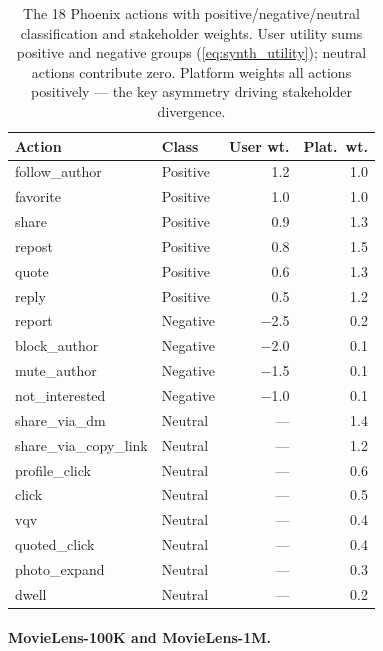 \documentclass[11pt,letterpaper]{article}
\begin{document}
\begin{table}[t]
  \caption{The 18 Phoenix actions with positive/negative/neutral
    classification and stakeholder weights. User utility sums
    positive and negative groups (\cref{eq:synth_utility}); neutral
    actions contribute zero. Platform weights all actions positively
    --- the key asymmetry driving stakeholder divergence.}
  \label{tab:actions}
  \centering\small
  \begin{tabular}{llrr}
    \toprule
    \textbf{Action} & \textbf{Class} & \textbf{User wt.} & \textbf{Plat.\ wt.} \\
    \midrule
    follow\_author          & Positive  & 1.2   & 1.0 \\
    favorite                & Positive  & 1.0   & 1.0 \\
    share                   & Positive  & 0.9   & 1.3 \\
    repost                  & Positive  & 0.8   & 1.5 \\
    quote                   & Positive  & 0.6   & 1.3 \\
    reply                   & Positive  & 0.5   & 1.2 \\
    \midrule
    report                  & Negative  & $-$2.5 & 0.2 \\
    block\_author           & Negative  & $-$2.0 & 0.1 \\
    mute\_author            & Negative  & $-$1.5 & 0.1 \\
    not\_interested         & Negative  & $-$1.0 & 0.1 \\
    \midrule
    share\_via\_dm          & Neutral   & ---   & 1.4 \\
    share\_via\_copy\_link  & Neutral   & ---   & 1.2 \\
    profile\_click          & Neutral   & ---   & 0.6 \\
    click                   & Neutral   & ---   & 0.5 \\
    vqv                     & Neutral   & ---   & 0.4 \\
    quoted\_click           & Neutral   & ---   & 0.4 \\
    photo\_expand           & Neutral   & ---   & 0.3 \\
    dwell                   & Neutral   & ---   & 0.2 \\
    \bottomrule
  \end{tabular}
\end{table}

\paragraph{MovieLens-100K and MovieLens-1M.}
\end{document}
